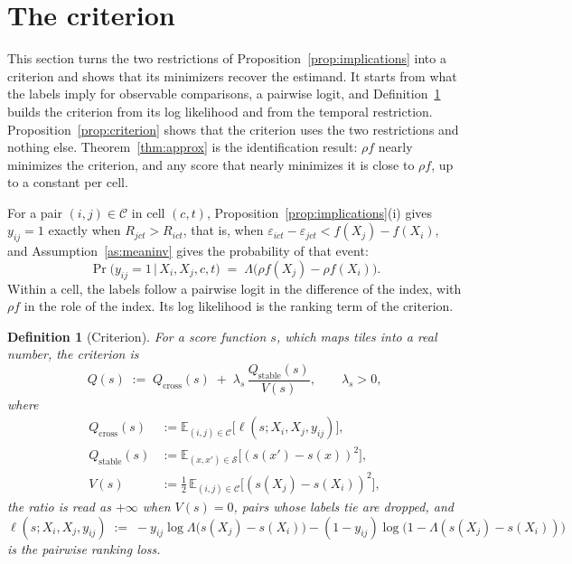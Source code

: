 \documentclass[11pt]{article}
\newtheorem{definition}{Definition}
\theoremstyle{remark}
\newcommand{\E}{\mathbb{E}}
\newcommand{\Qc}{Q_{\mathrm{cross}}}
\newcommand{\Qs}{Q_{\mathrm{stable}}}
\newcommand{\Qt}{Q}
\newcommand{\Cc}{\mathcal{C}}
\newcommand{\Ss}{\mathcal{S}}
\begin{document}
\section{The criterion}\label{sec:crit}

This section turns the two restrictions of Proposition~\ref{prop:implications} into a criterion and
shows that its minimizers recover the estimand. It starts from what the labels imply for observable
comparisons, a pairwise logit, and Definition~\ref{def:crit} builds the criterion from its log
likelihood and from the temporal restriction. Proposition~\ref{prop:criterion} shows that the criterion
uses the two restrictions and nothing else. Theorem~\ref{thm:approx} is the identification result:
$\rho f$ nearly minimizes the criterion, and any score that nearly minimizes it is close to $\rho f$,
up to a constant per cell.

For a pair $(i,j)\in\Cc$ in cell $(c,t)$, Proposition~\ref{prop:implications}(i) gives $y_{ij}=1$
exactly when $R_{jct} > R_{ict}$, that is, when $\varepsilon_{ict}-\varepsilon_{jct} < f(X_j) - f(X_i)$,
and Assumption~\ref{as:meaninv} gives the probability of that event:
\begin{equation}\label{eq:logit}
    \Pr\big(y_{ij} = 1 \,\big|\, X_i, X_j, c, t\big) \;=\; \Lambda\big(\rho f(X_j) - \rho f(X_i)\big).
\end{equation}
Within a cell, the labels follow a pairwise logit in the difference of the index, with $\rho f$ in the
role of the index. Its log likelihood is the ranking term of the criterion.

\begin{definition}[Criterion]\label{def:crit}
For a score function $s$, which maps tiles into a real number, the \emph{criterion} is
\begin{equation}\label{eq:loss}
    \Qt(s) \;:=\; \Qc(s) \;+\; \lambda_{s}\,\frac{\Qs(s)}{V(s)},
    \qquad \lambda_{s} > 0,
\end{equation}
where
\begin{align*}
    \Qc(s) &:= \E_{(i,j)\in\Cc}\big[\ell(s;X_i,X_j,y_{ij})\big],\\
    \Qs(s) &:= \E_{(x,x')\in\Ss}\big[(s(x')-s(x))^{2}\big],\\
    V(s) &:= \tfrac12\,\E_{(i,j)\in\Cc}\big[(s(X_j)-s(X_i))^{2}\big],
\end{align*}
the ratio is read as $+\infty$ when $V(s)=0$, pairs whose labels tie are dropped, and
\[
    \ell(s; X_i, X_j, y_{ij}) \;:=\; -y_{ij}\log\Lambda\big(s(X_j)-s(X_i)\big)
    - (1-y_{ij})\log\big(1-\Lambda(s(X_j)-s(X_i))\big)
\]
is the pairwise ranking loss.
\end{definition}
\end{document}

